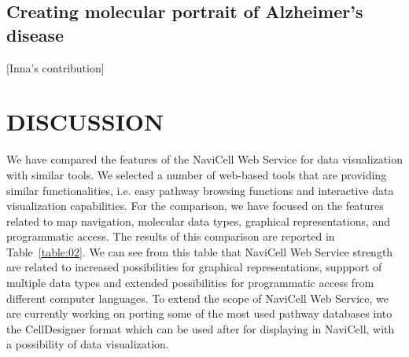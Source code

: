 \documentclass[a4,center,fleqn]{NAR}
\begin{document}
\subsection{Creating molecular portrait of Alzheimer's disease}

[Inna's contribution]

\section{DISCUSSION}

We have compared the features of the NaviCell Web Service for data visualization
with similar tools. We selected a number of web-based tools that are providing
similar functionalities, i.e. easy pathway browsing functions and interactive data
visualization capabilities. For the comparison, we have focused on the features
related to map navigation, molecular data types, graphical representations,
and programmatic access. The results of this comparison are reported in Table~\ref{table:02}. 
We can see from this table that NaviCell Web Service strength are related to
increased possibilities for graphical representations, suppport of multiple
data types and extended possibilities for programmatic access from different
computer languages.  To extend the scope of NaviCell Web Service, we are
currently working on porting some of the most used pathway databases into the
CellDesigner format which can be used after for displaying in NaviCell, with a
possibility of data visualization.
\end{document}
